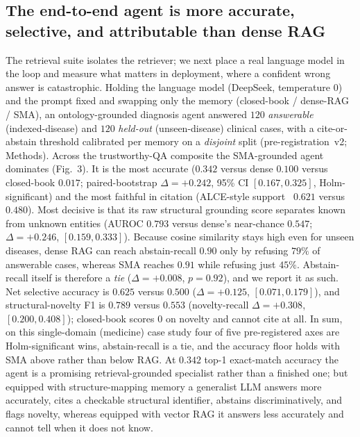 \documentclass[pdflatex,sn-nature]{sn-jnl}
\begin{document}
\subsection{The end-to-end agent is more accurate, selective, and attributable than dense RAG}
 The retrieval suite
isolates the retriever; we next place a real language model in the loop and
measure what matters in deployment, where a confident wrong answer is
catastrophic. Holding the language model (DeepSeek, temperature $0$) and the
prompt fixed and swapping only the memory (closed-book / dense-RAG / SMA), an
ontology-grounded diagnosis agent answered $120$ \emph{answerable}
(indexed-disease) and $120$ \emph{held-out} (unseen-disease) clinical cases, with
a cite-or-abstain threshold calibrated per memory on a \emph{disjoint} split
(pre-registration~v2; Methods). Across the trustworthy-QA composite the
SMA-grounded agent dominates (Fig.~3). It is the most accurate ($0.342$ versus
dense $0.100$ versus closed-book $0.017$; paired-bootstrap $\Delta{=}{+}0.242$,
95\% CI $[0.167,0.325]$, Holm-significant) and the most faithful in citation
(ALCE-style support~\cite{gao2023alce} $0.621$ versus $0.480$). Most decisive is
that its raw structural grounding score separates known from unknown entities
(AUROC $0.793$ versus dense's near-chance $0.547$; $\Delta{=}{+}0.246$,
$[0.159,0.333]$). Because cosine similarity stays high even for unseen diseases,
dense RAG can reach abstain-recall $0.90$ only by refusing $79\%$ of answerable
cases, whereas SMA reaches $0.91$ while refusing just $45\%$. Abstain-recall
itself is therefore a \emph{tie} ($\Delta{=}{+}0.008$, $p{=}0.92$), and we report
it as such. Net selective accuracy is $0.625$ versus $0.500$ ($\Delta{=}{+}0.125$,
$[0.071,0.179]$), and structural-novelty F1 is $0.789$ versus $0.553$
(novelty-recall $\Delta{=}{+}0.308$, $[0.200,0.408]$); closed-book scores $0$ on
novelty and cannot cite at all. In sum, on this single-domain (medicine) case
study four of five pre-registered axes are Holm-significant wins, abstain-recall is
a tie, and the accuracy floor holds with SMA above rather than below RAG. At
$0.342$ top-1 exact-match accuracy the agent is a promising retrieval-grounded
specialist rather than a finished one; but equipped with structure-mapping memory a
generalist LLM answers more accurately, cites a checkable structural identifier,
abstains discriminatively, and flags novelty, whereas equipped with vector RAG it
answers less accurately and cannot tell when it does not know.
\end{document}
